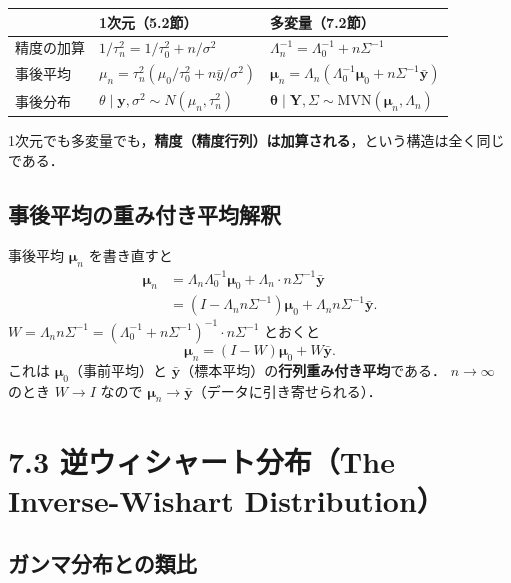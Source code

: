 \documentclass[lualatex,ja=standard,a4paper,12pt]{bxjsarticle}
\newcommand{\mvn}{\mathrm{MVN}}
\begin{document}
\begin{center}
\renewcommand{\arraystretch}{1.6}
\begin{tabular}{lll}
\toprule
 & 1次元（5.2節） & 多変量（7.2節） \\
\midrule
精度の加算 & $1/\tau_n^2 = 1/\tau_0^2 + n/\sigma^2$ & $\Lambda_n^{-1} = \Lambda_0^{-1} + n\Sigma^{-1}$ \\
事後平均 & $\mu_n = \tau_n^2({\mu_0}/{\tau_0^2} + {n\bar{y}}/{\sigma^2})$ & $\bm{\mu}_n = \Lambda_n(\Lambda_0^{-1}\bm{\mu}_0 + n\Sigma^{-1}\bar{\bm{y}})$ \\
事後分布 & $\theta \mid \bm{y}, \sigma^2 \sim N(\mu_n, \tau_n^2)$ & $\bm{\theta} \mid \bm{Y}, \Sigma \sim \mvn(\bm{\mu}_n, \Lambda_n)$ \\
\bottomrule
\end{tabular}
\end{center}

\noindent 1次元でも多変量でも，\textbf{精度（精度行列）は加算される}，という構造は全く同じである．

\subsection{事後平均の重み付き平均解釈}

事後平均 $\bm{\mu}_n$ を書き直すと
\begin{align*}
  \bm{\mu}_n
  &= \Lambda_n \Lambda_0^{-1}\bm{\mu}_0 + \Lambda_n \cdot n\Sigma^{-1}\bar{\bm{y}} \\
  &= (I - \Lambda_n n\Sigma^{-1})\bm{\mu}_0 + \Lambda_n n\Sigma^{-1} \bar{\bm{y}}.
\end{align*}
$W = \Lambda_n n\Sigma^{-1} = (\Lambda_0^{-1} + n\Sigma^{-1})^{-1} \cdot n\Sigma^{-1}$ とおくと
\[
  \bm{\mu}_n = (I - W)\bm{\mu}_0 + W\bar{\bm{y}}.
\]
これは $\bm{\mu}_0$（事前平均）と $\bar{\bm{y}}$（標本平均）の\textbf{行列重み付き平均}である．
$n \to \infty$ のとき $W \to I$ なので $\bm{\mu}_n \to \bar{\bm{y}}$（データに引き寄せられる）．

\section{7.3 逆ウィシャート分布（The Inverse-Wishart Distribution）}

\subsection{ガンマ分布との類比}
\end{document}

